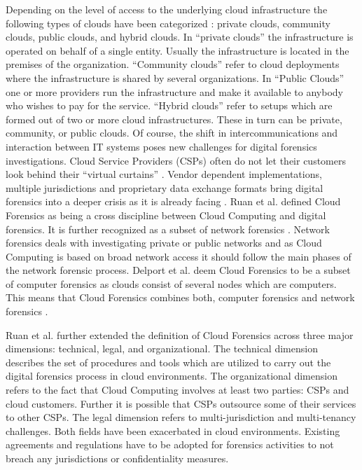 \documentclass[runningheads,a4paper]{llncs}
\begin{document}
Depending on the level of access to the underlying cloud infrastructure the following types of clouds have been categorized \cite{Mason2011,Krutz2010}: private clouds, community clouds, public clouds, and hybrid clouds. In ``private clouds'' the infrastructure is operated on behalf of a single entity. Usually the infrastructure is located in the premises of the organization. ``Community clouds'' refer to cloud deployments where the infrastructure is shared by several organizations. In ``Public Clouds'' one or more providers run the infrastructure and make it available to anybody who wishes to pay for the service. ``Hybrid clouds'' refer to setups which are formed out of two or more cloud infrastructures. These in turn can be private, community, or public clouds. Of course, the shift in intercommunications and interaction between IT systems poses new challenges for digital forensics investigations. Cloud Service Providers (CSPs) often do not let their customers look behind their ``virtual curtains'' \cite{Birk2011}. Vendor dependent implementations, multiple jurisdictions and proprietary data exchange formats \cite{Beebe2009} bring digital forensics into a deeper crisis as it is already facing \cite{Garfinkel2010}. Ruan et al. \cite{Ruan2011} defined Cloud Forensics as being a cross discipline between Cloud Computing and digital forensics. It is further recognized as a subset of network forensics \cite{Lillard2010}. Network forensics deals with investigating private or public networks and as Cloud Computing is based on broad network access it should follow the main phases of the network forensic process. Delport et al. \cite{Delport2011} deem Cloud Forensics to be a subset of computer forensics as clouds consist of several nodes which are computers. This means that Cloud Forensics combines both, computer forensics and network forensics \cite{BBC2000}. 

Ruan et al. \cite{Ruan2011} further extended the definition of Cloud Forensics across three major dimensions: technical, legal, and organizational. The technical dimension describes the set of procedures and tools which are utilized to carry out the digital forensics process in cloud environments. The organizational dimension refers to the fact that Cloud Computing involves at least two parties: CSPs and cloud customers. Further it is possible that CSPs outsource some of their services to other CSPs. The legal dimension refers to multi-jurisdiction and multi-tenancy challenges. Both fields have been exacerbated in cloud environments. Existing agreements and regulations have to be adopted for forensics activities to not breach any jurisdictions or confidentiality measures.
\end{document}
